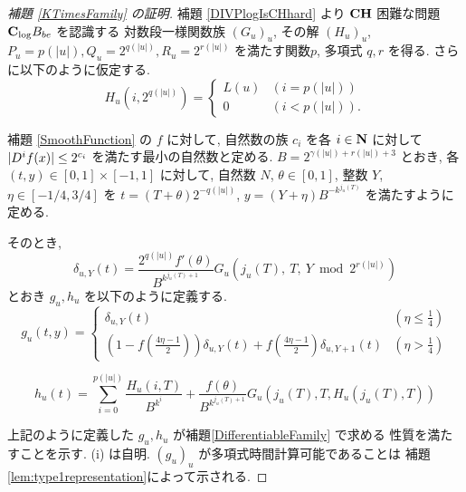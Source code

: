  \begin{proof}[\rm 補題 \ref{KTimesFamily} の証明]
  補題 \ref{DIVPlogIsCHhard} より
  $\mathbf{CH}$ 困難な問題 $\mathbf{C}_{\log} B_{be}$ を認識する
  対数段一様関数族 $(G_u)_u$, その解 $(H_u)_u$, 
  $P_u = p(|u|), Q_u = 2^{q(|u|)}, R_u = 2^{r(|u|)}$ を満たす関数$p$, 
  多項式 $q,r$ を得る.
  さらに以下のように仮定する.
  \begin{equation}
   H_u(i, 2^{q(|u|)}) = \begin{cases}
			L(u) & (i=p(|u|)) \\
			0 & (i<p(|u|)).
			\end{cases}
  \end{equation}

  補題 \ref{SmoothFunction} の $f$ に対して, 
  自然数の族 $c_i$ を各 $i \in \mathbf N$ に対して 
  $|D^i f(x)| \le 2^{c_i}$ を満たす最小の自然数と定める.
 $B = 2^{\gamma(|u|) + r(|u|) + 3}$ とおき, 
 各 $(t, y) \in [0,1] \times [-1, 1]$ に対して,
 自然数 $N$, $\theta \in [0,1]$, 整数 $Y$, $\eta \in [-1/4, 3/4]$ を
 $t = (T + \theta)2^{-q(|u|)}$, $y = (Y + \eta)B^{-k^{j_u(T)}}$ を満たすように
 定める.
 
 そのとき,
 \begin{equation}
  \delta_{u, Y} (t) = \frac{2^{q(|u|)} f'(\theta)}{B^{k^{j_u(T)+1}}} 
   G_u\left( j_u(T),\ T,\ Y \bmod 2^{r(|u|)} \right)
 \end{equation}
 とおき $g_u, h_u$ を以下のように定義する.
 \begin{equation}
  \label{eq:gu}
  g_u(t,y) 
  = \begin{cases}
     \delta_{u, Y}(t)
     & (\eta \le \frac 1 4)
     \\
     ( 1-f ( \frac{4\eta-1}{2})) \delta_{u, Y}(t) 
     + f ( \frac{4\eta-1}{2}) \delta_{u,Y+1}(t)
     & (\eta > \frac 1 4)
    \end{cases}
 \end{equation}

 \begin{equation} 
  h_u(t) = \sum^{p(|u|)}_{i=0} \frac{H_u(i, T)}{B^{k^i}}  
  + \frac{f(\theta)}{B^{k^{j_u(T)+1}}} G_u(j_u(T), T, H_u(j_u(T), T)) 
  \label{eq:hu}
 \end{equation}

 上記のように定義した $g_u, h_u$ が補題\ref{DifferentiableFamily} で求める
 性質を満たすことを示す. (i) は自明. 
 $(g_u)_u$ が多項式時間計算可能であることは
  補題 \ref{lem:type1representation}によって示される.


\end{proof}

